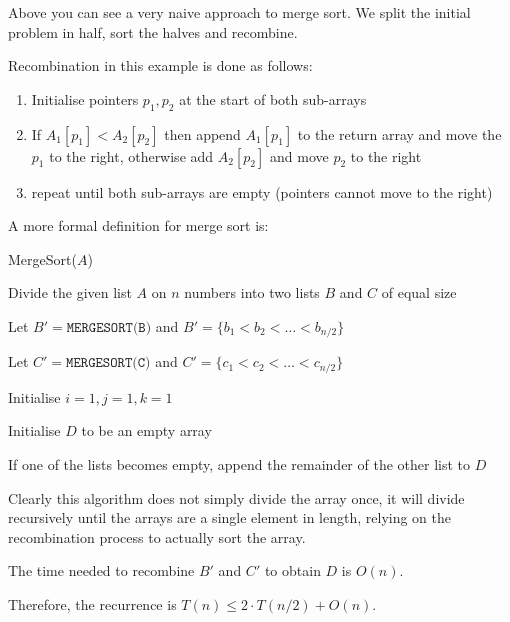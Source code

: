 \documentclass{article}
\begin{document}
Above you can see a very naive approach to merge sort. We split the initial problem in half, sort the halves and recombine.

Recombination in this example is done as follows:

\begin{enumerate}
  \item Initialise pointers $p_{1},p_{2}$ at the start of both sub-arrays
  \item If $A_{1}[p_{1}] < A_{2}[p_{2}]$  then append $A_{1}[p_{1}] $ to the return array and move the $p_{1}$ to the right, otherwise add $A_{2}[p_{2}] $ and move $p_2$ to the right
  \item repeat until both sub-arrays are empty (pointers cannot move to the right)
\end{enumerate}

A more formal definition for merge sort is:

\begin{algorithm}
  \caption{MergeSort($A$)}

  Divide the given list $A$ on $n$ numbers into two lists $B$ and $C$ of equal size

  Let $B'= \texttt{MERGESORT(B)} $ and $B' = \{b_{1}< b_{2}< \ldots < b_{n/2}\}$

  Let $C'= \texttt{MERGESORT(C)} $ and $C' = \{c_{1}< c_{2}< \ldots < c_{n/2}\}$

  Initialise $i=1, j=1,k=1$

  Initialise $D$ to be an empty array


  If one of the lists becomes empty, append the remainder of the other list to $D$




\end{algorithm}

Clearly this algorithm does not simply divide the array once, it will divide recursively until the arrays are a single element in length, relying on the recombination process to actually sort the array.

The time needed to recombine $B'$ and $C'$ to obtain $D$ is $O(n)$.

Therefore, the recurrence is $T(n) \leq 2\cdot T(n/2) + O(n)$.
\end{document}
